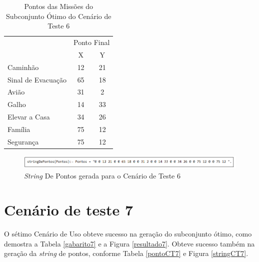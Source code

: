 \begin{table}[!h]
\centering
\caption{Pontos das Missões do Subconjunto Ótimo do Cenário de Teste 6}
\label{pontoCT6}
\begin{tabular}{lcc}
\rowcolor[HTML]{00D2CB} 
\multicolumn{1}{c}{\cellcolor[HTML]{00D2CB}} & \multicolumn{2}{l}{\cellcolor[HTML]{00D2CB}Ponto Final} \\ 
\rowcolor[HTML]{C0F2F0} 
\multicolumn{1}{c}{\cellcolor[HTML]{00D2CB}Missão} & \multicolumn{1}{c}{\cellcolor[HTML]{C0F2F0}X} & \multicolumn{1}{c}{\cellcolor[HTML]{C0F2F0}Y} \\
 Caminhão & 12 & 21 \\
 Sinal de Evacuação & 65 & 18 \\
 Avião & 31 & 2 \\
 Galho & 14 & 33 \\
 Elevar a Casa & 34 & 26 \\
 Família & 75 & 12 \\
 Segurança & 75 & 12    \\          
\end{tabular}
\end{table}


\FloatBarrier
\begin{figure}[!h]
\centering
\includegraphics[keepaspectratio=true,scale=0.7]{figuras/stringCT6.png}
\caption{\textit{String} De Pontos gerada para o Cenário de Teste 6}
\label{stringCT6}
\end{figure}



\section{Cenário de teste 7}

	O sétimo Cenário de Uso obteve sucesso na geração do subconjunto ótimo, como demostra a Tabela \ref{gabarito7} e a Figura \ref{resultado7}. Obteve sucesso também na geração da \textit{string} de pontos, conforme Tabela \ref{pontoCT7} e Figura \ref{stringCT7}.

